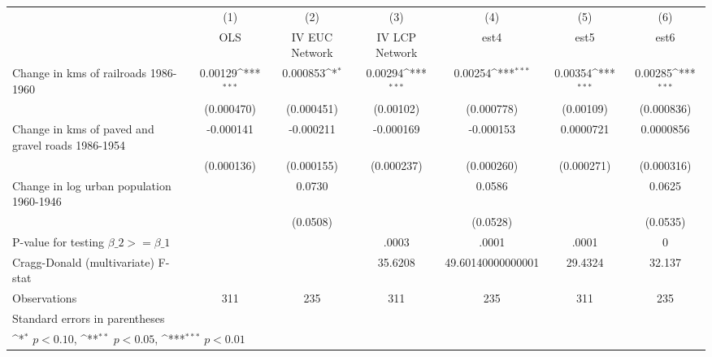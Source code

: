 {
\def\sym#1{\ifmmode^{#1}\else\(^{#1}\)\fi}
\begin{tabular}{l*{6}{c}}
\hline\hline
                &\multicolumn{1}{c}{(1)}&\multicolumn{1}{c}{(2)}&\multicolumn{1}{c}{(3)}&\multicolumn{1}{c}{(4)}&\multicolumn{1}{c}{(5)}&\multicolumn{1}{c}{(6)}\\
                &\multicolumn{1}{c}{OLS}&\multicolumn{1}{c}{IV EUC Network}&\multicolumn{1}{c}{IV LCP Network}&\multicolumn{1}{c}{est4}&\multicolumn{1}{c}{est5}&\multicolumn{1}{c}{est6}\\
\hline
Change in kms of railroads 1986-1960&  0.00129\sym{***}& 0.000853\sym{*}  &  0.00294\sym{***}&  0.00254\sym{***}&  0.00354\sym{***}&  0.00285\sym{***}\\
                &(0.000470)         &(0.000451)         &(0.00102)         &(0.000778)         &(0.00109)         &(0.000836)         \\
[1em]
Change in kms of paved and gravel roads 1986-1954&-0.000141         &-0.000211         &-0.000169         &-0.000153         &0.0000721         &0.0000856         \\
                &(0.000136)         &(0.000155)         &(0.000237)         &(0.000260)         &(0.000271)         &(0.000316)         \\
[1em]
Change in log urban population 1960-1946&                  &   0.0730         &                  &   0.0586         &                  &   0.0625         \\
                &                  & (0.0508)         &                  & (0.0528)         &                  & (0.0535)         \\
\hline
P-value for testing $\beta\_{2} >= \beta\_{1}$&                  &                  &    .0003         &    .0001         &    .0001         &        0         \\
Cragg-Donald (multivariate) F-stat&                  &                  &  35.6208         &49.60140000000001         &  29.4324         &   32.137         \\
Observations    &      311         &      235         &      311         &      235         &      311         &      235         \\
\hline\hline
\multicolumn{7}{l}{\footnotesize Standard errors in parentheses}\\
\multicolumn{7}{l}{\footnotesize \sym{*} \(p<0.10\), \sym{**} \(p<0.05\), \sym{***} \(p<0.01\)}\\
\end{tabular}
}
